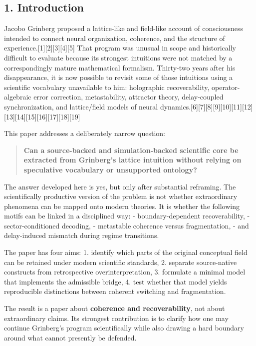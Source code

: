 \documentclass[
]{article}
\begin{document}
\subsection{1. Introduction}\label{introduction}

Jacobo Grinberg proposed a lattice-like and field-like account of
consciousness intended to connect neural organization, coherence, and
the structure of experience.{[}1{]}{[}2{]}{[}3{]}{[}4{]}{[}5{]} That
program was unusual in scope and historically difficult to evaluate
because its strongest intuitions were not matched by a correspondingly
mature mathematical formalism. Thirty-two years after his disappearance,
it is now possible to revisit some of those intuitions using a
scientific vocabulary unavailable to him: holographic recoverability,
operator-algebraic error correction, metastability, attractor theory,
delay-coupled synchronization, and lattice/field models of neural
dynamics.{[}6{]}{[}7{]}{[}8{]}{[}9{]}{[}10{]}{[}11{]}{[}12{]}{[}13{]}{[}14{]}{[}15{]}{[}16{]}{[}17{]}{[}18{]}{[}19{]}

This paper addresses a deliberately narrow question:

\begin{quote}
\textbf{Can a source-backed and simulation-backed scientific core be
extracted from Grinberg's lattice intuition without relying on
speculative vocabulary or unsupported ontology?}
\end{quote}

The answer developed here is yes, but only after substantial reframing.
The scientifically productive version of the problem is not whether
extraordinary phenomena can be mapped onto modern theories. It is
whether the following motifs can be linked in a disciplined way: -
boundary-dependent recoverability, - sector-conditioned decoding, -
metastable coherence versus fragmentation, - and delay-induced mismatch
during regime transitions.

The paper has four aims: 1. identify which parts of the original
conceptual field can be retained under modern scientific standards, 2.
separate source-native constructs from retrospective overinterpretation,
3. formulate a minimal model that implements the admissible bridge, 4.
test whether that model yields reproducible distinctions between
coherent switching and fragmentation.

The result is a paper about \textbf{coherence and recoverability}, not
about extraordinary claims. Its strongest contribution is to clarify how
one may continue Grinberg's program scientifically while also drawing a
hard boundary around what cannot presently be defended.
\end{document}
